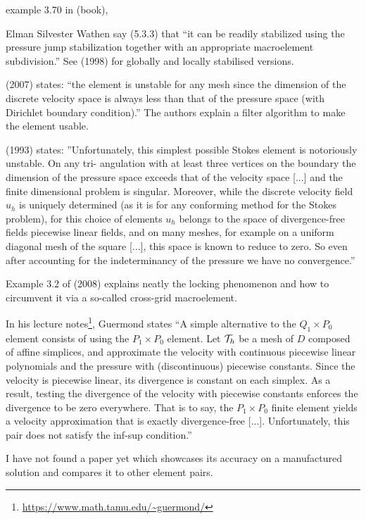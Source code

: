 example 3.70 in \textcite{john16} (book),


Elman Silvester Wathen say (5.3.3) that 
``it can be readily stabilized using the pressure jump
stabilization together with an appropriate macroelement subdivision.''
See \textcite{nosi98} (1998) for globally and locally stabilised versions. 

\textcite{qizh07b} (2007) states: ``the element is unstable for any mesh since
the dimension of the discrete velocity space is always less than that of the pressure space (with
Dirichlet boundary condition).'' The authors explain a filter algorithm to make the
element usable. 

\textcite{arno93} (1993) states: ''Unfortunately, this simplest possible Stokes element is notoriously unstable. On any tri-
angulation with at least three vertices on the boundary the dimension of the pressure
space exceeds that of the velocity space [...] and the finite
dimensional problem is singular. 
Moreover, while the discrete velocity field $u_h$ is uniquely
determined (as it is for any conforming method for the Stokes problem), for this choice of
elements $u_h$ belongs to the space of divergence-free fields piecewise linear fields, and on
many meshes, for example on a uniform diagonal mesh of the square [...],
this space is known to reduce to zero. So even after accounting for the indeterminancy of
the pressure we have no convergence.''

Example 3.2 of \textcite{bobf08} (2008) explains neatly the locking phenomenon and how 
to circumvent it via a so-called cross-grid macroelement.

In his lecture notes\footnote{\url{https://www.math.tamu.edu/~guermond/}}, 
Guermond states ``A simple alternative to the 
$Q_1\times P_0$ element consists of using the $P_1\times P_0$ element.
Let ${\cal T}_h$  be a mesh of $D$ composed of affine simplices, and approximate the 
velocity with continuous piecewise linear polynomials and the pressure with
(discontinuous) piecewise constants. Since the velocity is piecewise linear, its
divergence is constant on each simplex. As a result, testing the divergence
of the velocity with piecewise constants enforces the divergence to be zero
everywhere. That is to say, the $P_1\times P_0$ finite element yields a velocity 
approximation that is exactly divergence-free [...]. Unfortunately,
this pair does not satisfy the inf-sup condition.''

I have not found a paper yet which showcases its accuracy on a manufactured solution
and compares it to other element pairs.


